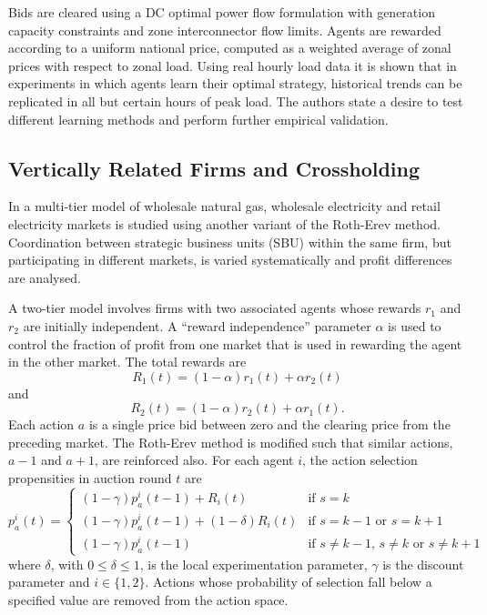 
Bids are cleared using a DC optimal power flow formulation with
generation capacity constraints and zone interconnector flow limits.  Agents are
rewarded according to a uniform national price, computed as a weighted average
of zonal prices with respect to zonal load.  Using real hourly load data it
is shown that in experiments in which agents learn their optimal
strategy, historical trends can be replicated in all but certain hours of
peak load.  The authors state a desire to test different learning methods and perform
further empirical validation.

\subsection{Vertically Related Firms and Crossholding}
In  a multi-tier model of wholesale natural gas, wholesale
electricity and retail electricity markets is studied using another variant of
the Roth-Erev method.  Coordination between strategic business units (SBU)
within the same firm, but participating in different markets, is varied
systematically and profit differences are analysed.

A two-tier model involves firms with two associated agents
whose rewards $r_1$ and $r_2$ are initially independent.  A ``reward
independence'' parameter $\alpha$ is used to control the fraction of profit
from one market that is used in rewarding the agent in the other market.
The total rewards are
\begin{equation}
R_1(t) = (1-\alpha)r_1(t) + \alpha r_2(t)
\end{equation}
and
\begin{equation}
R_2(t) = (1-\alpha)r_2(t) + \alpha r_1(t).
\end{equation}
Each action $a$ is a single price bid between zero and the clearing price from
the preceding market.  The Roth-Erev method is modified such that similar
actions, $a-1$ and $a+1$, are reinforced also.  For each agent $i$, the action
selection propensities in auction round $t$ are
\begin{equation}
p^i_a(t) = \begin{cases}
(1-\gamma)p^i_a(t-1) + R_i(t)& \text{if $s=k$}\\
(1-\gamma)p^i_a(t-1) + (1-\delta)R_i(t)& \text{if $s=k-1$ or $s=k+1$}\\
(1-\gamma)p^i_a(t-1)& \text{if $s\neq k-1$, $s\neq k$ or $s\neq k+1$}
\end{cases}
\end{equation}
where $\delta$, with $0\leq \delta \leq 1$, is the local experimentation
parameter, $\gamma$ is the discount parameter and $i\in \lbrace 1,2 \rbrace$.
Actions whose probability of selection fall below a specified value are
removed from the action space.

